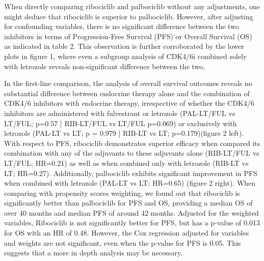When directly comparing ribociclib and palbociclib without any adjustments, one might deduce that ribociclib is superior to palbociclib. However, after adjusting for confounding variables, there is no significant difference between the two inhibitors in terms of Progression-Free Survival (PFS) or Overall Survival (OS) as indicated in table 2. This observation is further corroborated by the lower plots in figure 1, where even a subgroup analysis of CDK4/6i combined solely with letrozole reveals non-significant difference between the two.

In the first-line comparison, the analysis of overall survival outcomes reveals no substantial difference between endocrine therapy alone and the combination of CDK4/6 inhibitors with endocrine therapy, irrespective of whether the CDK4/6 inhibitors are administered with fulvestrant or letrozole  (PAL-LT/FUL vs LT/FUL; p=0.57 | RIB-LT/FUL vs LT/FUL p=0.069) or exclusively with letrozole (PAL-LT vs LT; p = 0.979 | RIB-LT vs LT; p=0.179)(figure 2 left). With respect to PFS, ribociclib demonstrates superior efficacy when compared its combination with any of the adjuvants to these adjuvants alone (RIB-LT/FUL vs LT/FUL; HR=0.21) as well as when combined only with letrozole (RIB-LT vs LT; HR=0.27). Additionally, palbociclib exhibits significant improvement in PFS when combined with letrozole  (PAL-LT vs LT; HR=0.65) (figure 2 right).
When comparing with propensity scores weighting, we found out that ribociclib is significantly better than palbociclib for PFS and OS, providing a median OS of over 40 months and median PFS of around 42 months. Adjusted for the weighted variables, Ribociclib is not significantly better for PFS, but has a p-value of 0.013 for OS with an HR of 0.48. However, the Cox regression adjusted for variables and weights are not significant, even when the p-value for PFS is 0.05. This suggests that a more in depth analysis may be necessary.


